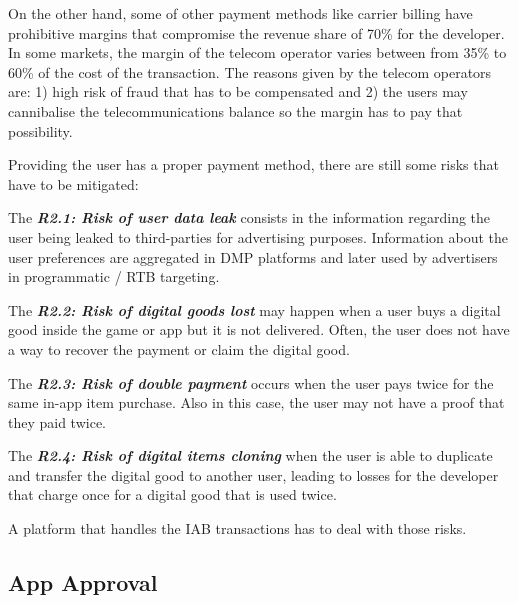 
\medskip

On the other hand, some of other payment methods like carrier billing have prohibitive margins that compromise the revenue share of 70\% for the developer. In some markets, the margin of the telecom operator varies between from 35\% to 60\% of the cost of the transaction. The reasons given by the telecom operators are: 1) high risk of fraud that has to be compensated and 2) the users may cannibalise the telecommunications balance so the margin has to pay that possibility.


\medskip

Providing the user has a proper payment method, there are still some risks that have to be mitigated:

\begin{tcolorbox}[enhanced jigsaw,sharp corners, drop fuzzy shadow=ShadowColor]

The {\bf\em R2.1: Risk of user data leak} consists in the information regarding the user being leaked to third-parties for advertising purposes. Information about the user preferences are aggregated in DMP platforms and later used by advertisers in programmatic / RTB targeting.


The {\bf\em R2.2: Risk of digital goods lost} may happen when a user buys a digital good inside the game or app but it is not delivered. Often, the user does not have a way to recover the payment or claim the digital good.

The {\bf\em R2.3: Risk of double payment} occurs when the user pays twice for the same in-app item purchase. Also in this case, the user may not have a proof that they paid twice.

The {\bf\em R2.4: Risk of digital items cloning} when the user is able to duplicate and transfer the digital good to another user, leading to losses for the developer that charge once for a digital good that is used twice.

\end{tcolorbox}

A platform that handles the IAB transactions has to deal with those risks.


\subsection{App Approval}
\label{subsec:intro_approval}

